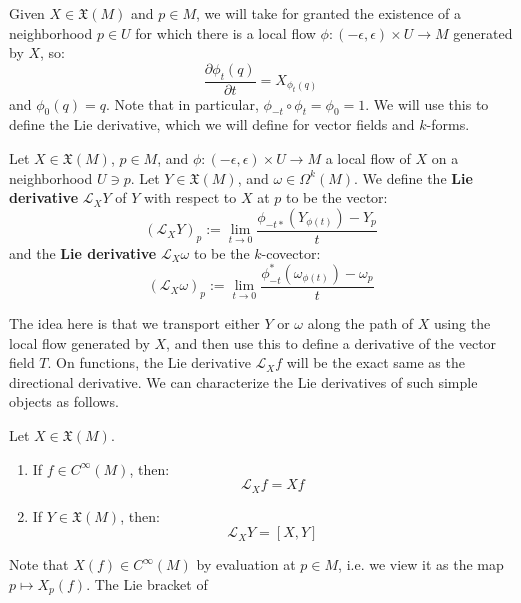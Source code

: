 Given $X\in\mathfrak X(M)$ and $p\in M$, we will take for granted the existence of a neighborhood $p\in U$ for which there is 
a local flow $\phi : (-\epsilon, \epsilon)\times U\rightarrow M$ generated by $X$, so:
\begin{equation}
	\frac{\partial\phi_t(q)}{\partial t} = X_{\phi_t(q)}
\end{equation}
and $\phi_0(q) = q$. Note that in particular, $\phi_{-t}\circ\phi_t = \phi_0 = 1$. We will use this to define the Lie derivative, 
which we will define for vector fields and $k$-forms. 
\begin{definition}
	Let $X\in\mathfrak X(M)$, $p\in M$, and $\phi : (-\epsilon, \epsilon)\times U\rightarrow M$ a local flow of $X$ on a 
	neighborhood $U\ni p$. 
	Let $Y\in\mathfrak X(M)$, and $\omega\in\Omega^k(M)$. We define the \textbf{Lie derivative} $\mathcal L_X Y$ of $Y$ 
	with respect to $X$ at $p$ to be the vector:
	\begin{equation}
		(\mathcal L_X Y)_p :=\lim_{t\rightarrow 0}\frac{\phi_{-t*}(Y_{\phi(t)}) - Y_p}{t}
	\end{equation}
	and the \textbf{Lie derivative} $\mathcal L_X\omega$ to be the $k$-covector:
	\begin{equation}
		(\mathcal L_X\omega)_p := \lim_{t\rightarrow 0}\frac{\phi_{-t}^* (\omega_{\phi(t)}) - \omega_{p}}{t}
	\end{equation}
\end{definition}
The idea here is that we transport either $Y$ or $\omega$ along the path of $X$ using the local flow generated by $X$, 
and then use this to define a derivative of the vector field $T$. On functions, the Lie derivative $\mathcal L_X f$ will be the 
exact same as the directional derivative. We can characterize the Lie derivatives of such simple objects as follows.
\begin{theorem}
	Let $X\in\mathfrak X(M)$. 
	\begin{enumerate}
		\item If $f\in C^\infty(M)$, then:
		\begin{equation}
			\mathcal L_X f = Xf
		\end{equation}
		\item If $Y\in\mathfrak X(M)$, then:
		\begin{equation}
			\mathcal L_X Y = [X, Y]
		\end{equation}
	\end{enumerate}
\end{theorem}
Note that $X(f)\in C^\infty(M)$ by evaluation at $p\in M$, i.e. we view it as the map $p\mapsto X_p(f)$. The Lie bracket of 
